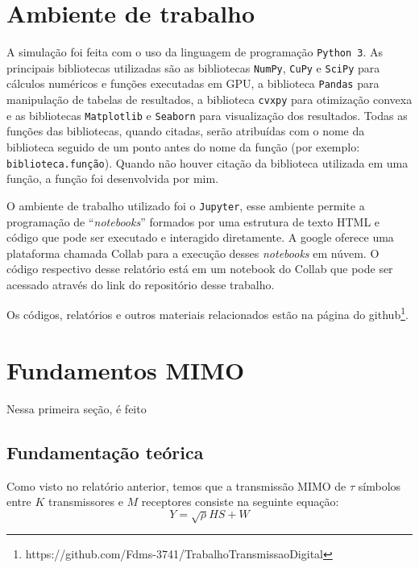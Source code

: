 \documentclass{article}
\begin{document}
\section{Ambiente de trabalho}
\label{sec:ambiente_trabalho}

A simulação foi feita com o uso da linguagem de programação \texttt{Python 3}. As principais bibliotecas utilizadas são as bibliotecas \texttt{NumPy}, \texttt{CuPy} e \texttt{SciPy} para cálculos numéricos e funções executadas em GPU, a biblioteca \texttt{Pandas} para manipulação de tabelas de resultados, a biblioteca \texttt{cvxpy} para otimização convexa e as bibliotecas \texttt{Matplotlib} e \texttt{Seaborn} para visualização dos resultados. Todas as funções das bibliotecas, quando citadas, serão atribuídas com o nome da biblioteca seguido de um ponto antes do nome da função (por exemplo: \texttt{biblioteca.função}). Quando não houver citação da biblioteca utilizada em uma função, a função foi desenvolvida por mim.

O ambiente de trabalho utilizado foi o \texttt{Jupyter}, esse ambiente permite a programação de ``\textit{notebooks}'' formados por uma estrutura de texto HTML e código que pode ser executado e interagido diretamente. A google oferece uma plataforma chamada Collab para a execução desses \textit{notebooks} em núvem. O código respectivo desse relatório está em um notebook do Collab que pode ser acessado através do link do repositório desse trabalho.

Os códigos, relatórios e outros materiais relacionados estão na página do github\footnote{https://github.com/Fdms-3741/TrabalhoTransmissaoDigital}.

\section{Fundamentos MIMO}
\label{sec:fundamentos_mimo}

Nessa primeira seção, é feito 

\subsection{Fundamentação teórica}

Como visto no relatório anterior, temos que a transmissão MIMO de $\tau$ símbolos entre $K$ transmissores e $M$ receptores consiste na seguinte equação:
\begin{equation}
    Y = \sqrt\rho HS + W
    \label{eq:transmissao_mimo}
\end{equation}
\end{document}
